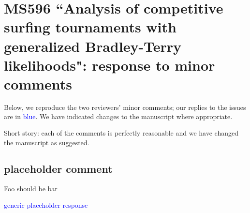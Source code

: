 \documentclass[12pt]{article}
\begin{document}
\section*{MS596 ``Analysis of competitive surfing tournaments with generalized Bradley-Terry likelihoods": response to minor comments}

Below, we reproduce the two reviewers' minor comments; our replies to
the issues are in \textcolor{blue}{blue}.  We have indicated changes
to the manuscript where appropriate.

Short story: each of the  comments is perfectly reasonable and we have 
changed the manuscript as suggested.

\subsection*{placeholder comment}

Foo should be bar

\textcolor{blue}{generic placeholder response}
\end{document}
